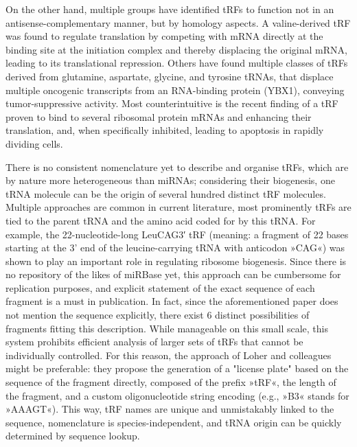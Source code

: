 On the other hand, multiple groups have identified tRFs to function not in an antisense-complementary manner, but by homology aspects. A valine-derived tRF was found to regulate translation by competing with mRNA directly at the binding site at the initiation complex and thereby displacing the original mRNA, leading to its translational repression\cite{Gebetsberger2017}. Others have found multiple classes of tRFs derived from glutamine, aspartate, glycine, and tyrosine tRNAs, that displace multiple oncogenic transcripts from an RNA-binding protein (YBX1), conveying tumor-suppressive activity\cite{Goodarzi2015}. Most counterintuitive is the recent finding of a tRF proven to bind to several ribosomal protein mRNAs and enhancing their translation, and, when specifically inhibited, leading to apoptosis in rapidly dividing cells\cite{Kim2017}.

There is no consistent nomenclature yet to describe and organise tRFs, which are by nature more heterogeneous than miRNAs; considering their biogenesis, one tRNA molecule can be the origin of several hundred distinct tRF molecules. Multiple approaches are common in current literature, most prominently tRFs are tied to the parent tRNA and the amino acid coded for by this tRNA. For example, the 22-nucleotide-long LeuCAG3′ tRF (meaning: a fragment of 22 bases starting at the 3' end of the leucine-carrying tRNA with anticodon »CAG«) was shown to play an important role in regulating ribosome biogenesis\cite{Kim2017}. Since there is no repository of the likes of miRBase yet, this approach can be cumbersome for replication purposes, and explicit statement of the exact sequence of each fragment is a must in publication. In fact, since the aforementioned paper does not mention the sequence explicitly, there exist 6 distinct possibilities of fragments fitting this description. While manageable on this small scale, this system prohibits efficient analysis of larger sets of tRFs that cannot be individually controlled. For this reason, the approach of Loher and colleagues\cite{Loher2017} might be preferable: they propose the generation of a "license plate" based on the sequence of the fragment directly, composed of the prefix »tRF«, the length of the fragment, and a custom oligonucleotide string encoding (e.g., »B3« stands for »AAAGT«). This way, tRF names are unique and unmistakably linked to the sequence, nomenclature is species-independent, and tRNA origin can be quickly determined by sequence lookup.


